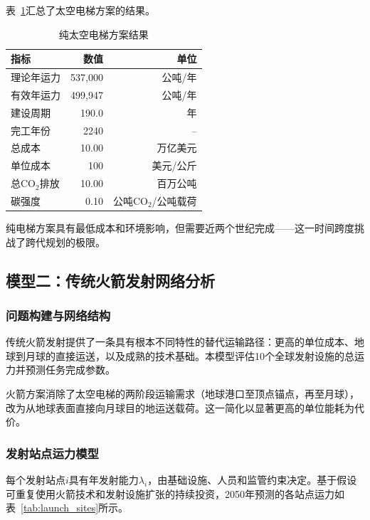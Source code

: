 表~\ref{tab:model1_results}汇总了太空电梯方案的结果。

\begin{table}[htbp]
    \centering
    \caption{纯太空电梯方案结果}
    \label{tab:model1_results}
    \begin{tabular}{lrr}
        \toprule
        指标 & 数值 & 单位 \\
        \midrule
        理论年运力 & 537,000 & 公吨/年 \\
        有效年运力 & 499,947 & 公吨/年 \\
        建设周期 & 190.0 & 年 \\
        完工年份 & 2240 & -- \\
        总成本 & 10.00 & 万亿美元 \\
        单位成本 & 100 & 美元/公斤 \\
        总CO$_2$排放 & 10.00 & 百万公吨 \\
        碳强度 & 0.10 & 公吨CO$_2$/公吨载荷 \\
        \bottomrule
    \end{tabular}
\end{table}

纯电梯方案具有最低成本和环境影响，但需要近两个世纪完成——这一时间跨度挑战了跨代规划的极限。

\subsection{模型二：传统火箭发射网络分析}

\subsubsection{问题构建与网络结构}

传统火箭发射提供了一条具有根本不同特性的替代运输路径：更高的单位成本、地球到月球的直接运送，以及成熟的技术基础。本模型评估10个全球发射设施的总运力并预测任务完成参数。

火箭方案消除了太空电梯的两阶段运输需求（地球港口至顶点锚点，再至月球），改为从地球表面直接向月球目的地运送载荷。这一简化以显著更高的单位能耗为代价。

\subsubsection{发射站点运力模型}

每个发射站点$i$具有年发射能力$\lambda_i$，由基础设施、人员和监管约束决定。基于假设可重复使用火箭技术和发射设施扩张的持续投资，2050年预测的各站点运力如表~\ref{tab:launch_sites}所示。

